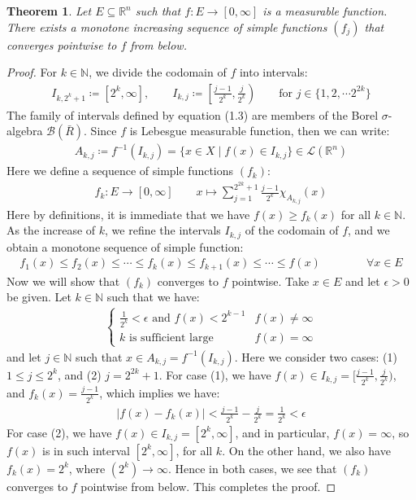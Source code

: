 \documentclass[11pt]{book}
\theoremstyle{break}
\theoremstyle{break}
\newtheorem{thm}{Theorem}[section]
\newcommand{\R}{\mathbb{R}}
\newcommand{\N}{\mathbb{N}}
\begin{document}
\newpage
\begin{thm}
Let $E \subseteq \R^n$ such that $f:E \to [0,\infty]$ is a measurable function. There exists a monotone increasing sequence of simple functions $(f_j)$ that converges pointwise to $f$ from below.  
\end{thm}
\begin{proof}
For $k \in \N$, we divide the codomain of $f$ into intervals:
\begin{align}
I_{k, 2^k+1} \coloneqq [2^k, \infty], \qquad I_{k,j} \coloneqq \left[ \frac{j-1}{2^k}, \frac{j}{2^k}\right) \qquad\text{for }j\in \{1,2,\cdots 2^{2k}\} 
\end{align}
The family of intervals defined by equation (1.3) are members of the Borel $\sigma$-algebra $\mathcal{B}(\bar{R})$. Since $f$ is Lebesgue measurable function, then we can write:
\begin{align*}
A_{k,j}\coloneqq f^{-1}(I_{k,j}) = \{ x \in X \mid f(x) \in I_{k,j}\} \in \mathcal{L}(\R^n)
\end{align*}
Here we define a sequence of simple functions $(f_k)$:
\begin{align*}
f_k:E \to [0,\infty] \qquad x\mapsto \sum_{j=1}^{2^{2k}+1} \frac{j-1}{2^k}\chi_{A_{k,j}}(x)
\end{align*}
Here by definitions, it is immediate that we have $f(x) \geq f_k(x)$ for all $k \in \N$. As the increase of $k$, we refine the intervals $I_{k,j}$ of the codomain of $f$, and we obtain a monotone sequence of simple function:
\begin{align*}
f_1(x) \leq f_2(x) \leq \cdots \leq f_k(x) \leq f_{k+1}(x) \leq \cdots \leq f(x) \qquad\qquad \forall x \in E
\end{align*}
Now we will show that $(f_k)$ converges to $f$ pointwise. Take $x \in E$ and let $\epsilon>0$ be given. Let $k \in \N$ such that we have:
\begin{align*}
\begin{cases}
\frac{1}{2^k}< \epsilon \text{ and } f(x)< 2^{k-1} & f(x) \neq \infty\\
k \text{ is sufficient large} & f(x) = \infty
\end{cases}
\end{align*} 
and let $j \in \N$ such that $x \in A_{k,j} = f^{-1}(I_{k,j})$. Here we consider two cases: (1) $1\leq j \leq 2^k$, and (2) $j = 2^{2k}+1$. For case (1), we have $f(x) \in I_{k,j}=[\frac{j-1}{2^k}, \frac{j}{2^k})$, and $f_k(x) = \frac{j-1}{2^k}$, which implies we have:
\begin{align*}
|f(x) - f_k(x)| < \frac{j-1}{2^k}- \frac{j}{2^k} = \frac{1}{2^k}< \epsilon
\end{align*}
For case (2), we have $f(x) \in I_{k,j} = [2^k, \infty]$, and in particular, $f(x)=\infty$, so $f(x)$ is in such interval $[2^k, \infty]$, for all $k$. On the other hand, we also have $f_k(x) = 2^k$, where $(2^k)\to \infty$. Hence in both cases, we see that $(f_k)$ converges to $f$ pointwise from below. This completes the proof. 
\end{proof}
\end{document}
